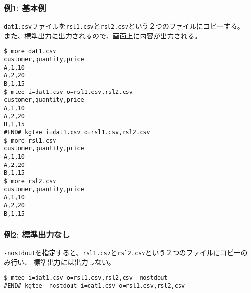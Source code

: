 \subsubsection*{例1: 基本例}

\verb|dat1.csv|ファイルを\verb|rsl1.csv|と\verb|rsl2.csv|という２つのファイルにコピーする。
また、標準出力に出力されるので、画面上に内容が出力される。


\begin{Verbatim}[baselinestretch=0.7,frame=single]
$ more dat1.csv
customer,quantity,price
A,1,10
A,2,20
B,1,15
$ mtee i=dat1.csv o=rsl1.csv,rsl2.csv
customer,quantity,price
A,1,10
A,2,20
B,1,15
#END# kgtee i=dat1.csv o=rsl1.csv,rsl2.csv
$ more rsl1.csv
customer,quantity,price
A,1,10
A,2,20
B,1,15
$ more rsl2.csv
customer,quantity,price
A,1,10
A,2,20
B,1,15
\end{Verbatim}
\subsubsection*{例2: 標準出力なし}

\verb|-nostdout|を指定すると、\verb|rsl1.csv|と\verb|rsl2.csv|という２つのファイルにコピーのみ行い、
標準出力には出力しない。


\begin{Verbatim}[baselinestretch=0.7,frame=single]
$ mtee i=dat1.csv o=rsl1.csv,rsl2,csv -nostdout
#END# kgtee -nostdout i=dat1.csv o=rsl1.csv,rsl2,csv
\end{Verbatim}

